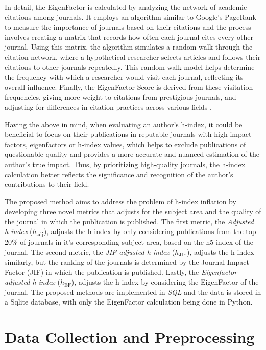 In detail, the EigenFactor is calculated by analyzing the network of academic
citations among journals. It employs an algorithm similar to Google's PageRank
to measure the importance of journals based on their citations and the process
involves creating a matrix that records how often each journal cites every
other journal. Using this matrix, the algorithm simulates a random walk through
the citation network, where a hypothetical researcher selects articles and
follows their citations to other journals repeatedly. This random walk model
helps determine the frequency with which a researcher would visit each journal,
reflecting its overall influence. Finally, the EigenFactor Score is derived
from these visitation frequencies, giving more weight to citations from
prestigious journals, and adjusting for differences in citation practices
across various fields \cite{Bergstrom11433, Alan2009}.

Having the above in mind, when evaluating an author's h-index, it could be
beneficial to focus on their publications in reputable journals with high
impact factors, eigenfactors or h-index values, which helps to exclude
publications of questionable quality and provides a more accurate and nuanced
estimation of the author's true impact. Thus, by prioritizing high-quality
journals, the h-index calculation better reflects the significance and
recognition of the author's contributions to their field.

The proposed method aims to address the problem of h-index inflation by
developing three novel metrics that adjusts for the subject area and the
quality of the journal in which the publication is published. The first metric,
the \textit{Adjusted h-index} ($h_{\text{adj}}$), adjusts the h-index by only
considering publications from the top 20\% of journals in it's corresponding
subject area, based on the h5 index of the journal. The second metric, the
\textit{JIF-adjusted h-index} ($h_{\text{JIF}}$), adjusts the h-index
similarly, but the ranking of the journals is determined by the Journal Impact
Factor (JIF) in which the publication is published. Lastly, the
\textit{Eigenfactor-adjusted h-index} ($h_{\text{EF}}$), adjusts the h-index by
considering the EigenFactor of the journal. The proposed methods are
implemented in \emph{SQL} and the data is stored in a Sqlite database, with
only the EigenFactor calculation being done in Python.

\section{Data Collection and Preprocessing}

